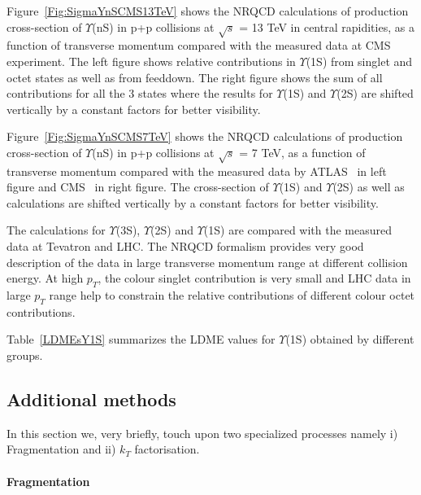 Figure~\ref{Fig:SigmaYnSCMS13TeV} shows the NRQCD calculations of production cross-section of $\Upsilon$(nS)
      in p+p collisions at $\sqrt{s}$ = 13 TeV in central rapidities, as a function of
      transverse momentum compared with the measured data at CMS~\cite{CMS:2017dju}
      experiment. The left figure shows relative contributions in $\Upsilon$(1S) from
      singlet and octet states as well as from feeddown. The right figure shows the sum
      of all contributions for all the 3 states where the results for $\Upsilon$(1S) and
      $\Upsilon$(2S) are shifted vertically by a constant factors for better visibility.


Figure~\ref{Fig:SigmaYnSCMS7TeV} shows the NRQCD calculations of production cross-section of $\Upsilon$(nS) in
      p+p collisions at $\sqrt{s}$ = 7 TeV, as a function of transverse momentum compared with
      the measured data by ATLAS~\cite{ATLAS:2012lmu} in left figure and CMS~\cite{CMS:2013qur}
      in right figure. The cross-section of $\Upsilon$(1S) and $\Upsilon$(2S) as well as
      calculations are shifted vertically by a constant factors for better visibility.

      The calculations for  $\Upsilon$(3S), $\Upsilon$(2S) and $\Upsilon$(1S) are compared with 
the measured data at Tevatron and LHC. The NRQCD formalism provides  very good description of the data in 
large transverse momentum range at different collision energy. 
   At high $p_T$, the colour singlet contribution is very small and LHC data in large $p_T$ range 
 help to constrain the relative contributions of different colour octet contributions.
  
Table~\ref{LDMEsY1S} summarizes the LDME values for $\Upsilon$(1S) obtained by 
different groups.







\subsection{Additional methods}

In this section we, very briefly, touch upon two specialized processes namely
i) Fragmentation and ii) $k_T$ factorisation. 

\paragraph{Fragmentation}

